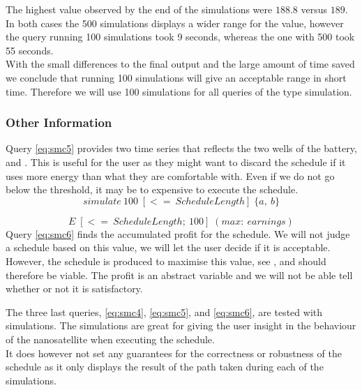 The highest value observed by the end of the simulations were $188.8$ versus $189$.
In both cases the 500 simulations displays a wider range for the value, however the query running 100 simulations took 9 seconds, whereas the one with 500 took 55 seconds.\\
With the small differences to the final output and the large amount of time saved we conclude that running 100 simulations will give an acceptable range in short time.
Therefore we will use 100 simulations for all queries of the type simulation.

\subsubsection*{Other Information}
Query \ref{eq:smc5} provides two time series that reflects the two wells of the battery,  and .
This is useful for the user as they might want to discard the schedule if it uses more energy than what they are comfortable with. Even if we do not go below the threshold, it may be to expensive to execute the schedule.
\begin{equation} \label{eq:smc5}
	simulate\ 100 \; [<=\ ScheduleLength]\; \{ a,\ b\}
\end{equation}

\begin{equation} \label{eq:smc6}
	E \; [<=\ ScheduleLength;\ 100]\; ( max:\ earnings)
\end{equation}
Query \ref{eq:smc6} finds the accumulated profit for the schedule.
We will not judge a schedule based on this value, we will let the user decide if it is acceptable.
However, the schedule is produced to maximise this value, see , and should therefore be viable.
The profit is an abstract variable and we will not be able tell whether or not it is satisfactory.

The three last queries, \ref{eq:smc4}, \ref{eq:smc5}, and \ref{eq:smc6}, are tested with simulations.
The simulations are great for giving the user insight in the behaviour of the nanosatellite when executing the schedule. \\
It does however not set any guarantees for the correctness or robustness of the schedule as it only displays the result of the path taken during each of the simulations.
